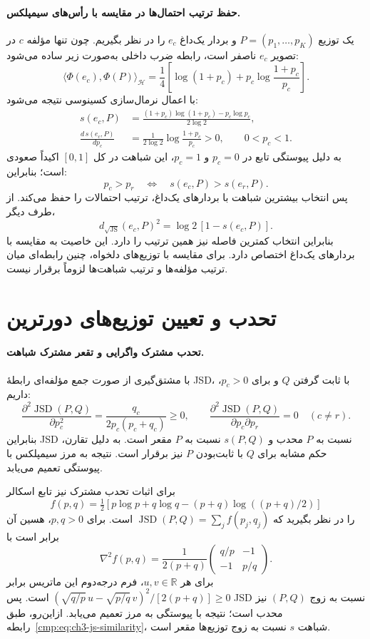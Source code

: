 \paragraph{حفظ ترتیب احتمال‌ها در مقایسه با رأس‌های سیمپلکس.}
یک توزیع $P=(p_1,\ldots,p_K)$ و بردار یک‌داغ $e_c$ را در نظر بگیریم. چون تنها مؤلفه $c$ در تصویر $e_c$ ناصفر است، رابطه ضرب داخلی به‌صورت زیر ساده می‌شود:
\[
\langle\Phi(e_c),\Phi(P)\rangle_{\mathcal H}
=\frac14\left[
\log(1+p_c)+p_c\log\frac{1+p_c}{p_c}
\right].
\]
با اعمال نرمال‌سازی کسینوسی نتیجه می‌شود:
\begin{equation}\label{eq:app-ch3-js-onehot-monotonic}
\begin{aligned}
s(e_c,P)
&=\frac{(1+p_c)\log(1+p_c)-p_c\log p_c}{2\log2},\\
\frac{d\,s(e_c,P)}{dp_c}
&=\frac{1}{2\log2}\log\frac{1+p_c}{p_c}>0,
\qquad 0<p_c<1.
\end{aligned}
\end{equation}
به دلیل پیوستگی تابع در $p_c=0$ و $p_c=1$، این شباهت در کل $[0,1]$ اکیداً صعودی است؛ بنابراین:
\[
p_c>p_r\quad\Longleftrightarrow\quad
s(e_c,P)>s(e_r,P).
\]
پس انتخاب بیشترین شباهت با بردارهای یک‌داغ،
ترتیب احتمالات را حفظ می‌کند.
از طرف دیگر،
\[
d_{\sqrt{\mathrm{JS}}}(e_c,P)^2
=\log2\,[1-s(e_c,P)].
\]
بنابراین انتخاب کمترین فاصله نیز همین ترتیب را دارد.
این خاصیت به مقایسه با بردارهای یک‌داغ اختصاص دارد.
برای مقایسه با توزیع‌های دلخواه، چنین رابطه‌ای میان ترتیب مؤلفه‌ها و ترتیب شباهت‌ها لزوماً برقرار نیست.

\section{تحدب و تعیین توزیع‌های دورترین}
\paragraph{تحدب مشترک واگرایی و تقعر مشترک شباهت.}
با مشتق‌گیری از صورت جمع مؤلفه‌ای رابطهٔ JSD، با ثابت گرفتن $Q$ و برای $p_c>0$، داریم:
\[
\frac{\partial^2\operatorname{JSD}(P,Q)}{\partial p_c^2}
=\frac{q_c}{2p_c(p_c+q_c)}\ge0,
\qquad
\frac{\partial^2\operatorname{JSD}(P,Q)}
{\partial p_c\partial p_r}=0\quad(c\ne r).
\]
بنابراین JSD نسبت به $P$ محدب و $s(P,Q)$ نسبت به $P$ مقعر است. به دلیل تقارن، حکم مشابه برای $Q$ با ثابت‌بودن $P$ نیز برقرار است. نتیجه به مرز سیمپلکس با پیوستگی تعمیم می‌یابد.

برای اثبات تحدب مشترک نیز تابع اسکالر
\[
f(p,q)=\tfrac12[p\log p+q\log q-(p+q)\log((p+q)/2)]
\]
را در نظر بگیرید که $\operatorname{JSD}(P,Q)=\sum_jf(p_j,q_j)$ است. برای $p,q>0$، هسین آن برابر است با
\begin{equation}\label{eq:app-pd-js-joint-convexity}
\nabla^2 f(p,q)=\frac{1}{2(p+q)}
\begin{pmatrix}
q/p&-1\\
-1&p/q
\end{pmatrix}.
\end{equation}
برای هر $u,v\in\mathbb R$، فرم درجه‌دوم این ماتریس برابر
$(\sqrt{q/p}\,u-\sqrt{p/q}\,v)^2/[2(p+q)]\ge0$
است. پس JSD نسبت به زوج $(P,Q)$ نیز محدب است؛ نتیجه با پیوستگی به مرز تعمیم می‌یابد. ازاین‌رو، طبق رابطه~\eqref{cmp:eq:ch3-js-similarity}، شباهت $s$ نسبت به زوج توزیع‌ها مقعر است.

